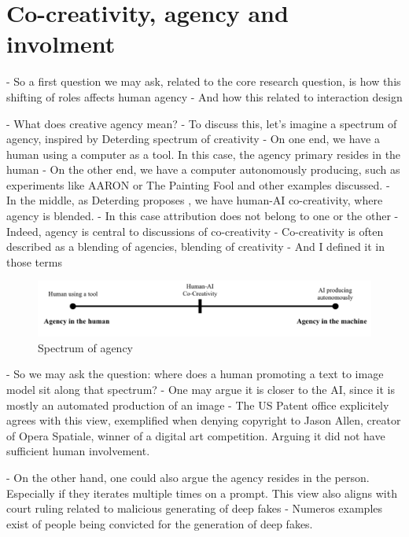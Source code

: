

\section{Co-creativity, agency and involment}

- So a first question we may ask, related to the core research question, is how this shifting of roles affects human agency
- And how this related to interaction design

- What does creative agency mean?
- To discuss this, let's imagine a spectrum of agency, inspired by Deterding spectrum of creativity
- On one end, we have a human using a computer as a tool. In this case, the agency primary resides in the human
- On the other end, we have a computer autonomously producing, such as experiments like AARON \cite{Cohen1995-wt} or The Painting Fool \cite{Colton2012-jc} and other examples discussed. 
- In the middle, as Deterding proposes \cite{Deterding2017-wh}, we have human-AI co-creativity, where agency is blended. 
- In this case attribution does not belong to one or the other 
- Indeed, agency is central to discussions of co-creativity
- Co-creativity is often described as a blending of agencies, blending of creativity \cite{Moruzzi2024-cq, Lawton2023-tb, Kantosalo2021-mp, Bown2020-oc, Deterding2017-wh, McCormack2020-ix, Bown2015-ig, Moruzzi2022-gp, Inie2023-ml, Palani2024-on, Li2024-yh}
- And I defined it in those terms

\begin{figure}
    \centering
    \includegraphics[width=1\linewidth]{agency spectrum.png}
    \caption{Spectrum of agency}
    \label{fig:enter-label}
\end{figure}

- So we may ask the question: where does a human promoting a text to image model sit along that spectrum?
- One may argue it is closer to the AI, since it is mostly an automated production of an image
- The US Patent office explicitely agrees with this view, exemplified when denying copyright to Jason Allen, creator of Opera Spatiale, winner of a digital art competition. Arguing it did not have sufficient human involvement. 

- On the other hand, one could also argue the agency resides in the person. Especially if they iterates multiple times on a prompt. This view also aligns with court ruling related to malicious generating of deep fakes
- Numeros examples exist of people being convicted for the generation of deep fakes. 

